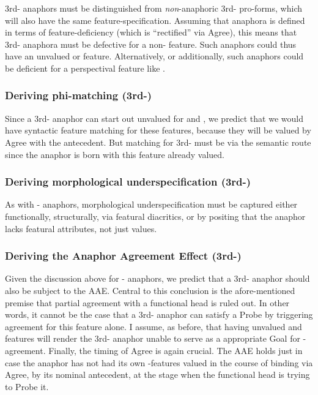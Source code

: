 \documentclass[output=paper, modfonts, nonflat]{langsci/langscibook}
\begin{document}
3rd-\person{} anaphors must be distinguished from \emph{non}-anaphoric
3rd-\person{} pro-forms, which will also have the same
feature-specification. Assuming that anaphora is defined in terms of
feature-deficiency (which is ``rectified'' via Agree), this means that
3rd-\person{} anaphora must be defective for a non-\person{}
feature. Such anaphors could thus have an unvalued \num{} or \gender{}
feature. Alternatively, or additionally, such anaphors could be
deficient for a perspectival feature like \dep{}
\citep{sundaresan:2012, sundaresan:2018}.

\subsubsection{Deriving phi-matching (3rd-\person)}

Since a 3rd-\person{} anaphor can start out unvalued for \num{} and
\gender, we predict that we would have syntactic feature matching for
these features, because they will be valued by Agree with the
antecedent. But matching for 3rd-\person{} must be via the semantic
route since the anaphor is born with this feature already valued.

\subsubsection{Deriving morphological underspecification (3rd-\person)}

As with \nul-\person{} anaphors, morphological underspecification must
be captured either functionally, structurally, via featural
diacritics, or by positing that the anaphor lacks featural attributes,
not just values.

\subsubsection{Deriving the Anaphor Agreement Effect (3rd-\person)}

Given the discussion above for \nul-\person{} anaphors, we predict
that a 3rd-\person{} anaphor should also be subject to the
AAE. Central to this conclusion is the afore-mentioned premise that
partial agreement with a functional head is ruled out. In other words,
it cannot be the case that a 3rd-\person{} anaphor can satisfy a Probe
by triggering agreement for this feature alone. I assume, as before,
that having unvalued \num{} and \gender{} features will render the
3rd-\person{} anaphor unable to serve as a appropriate Goal for
\ph-agreement. Finally, the timing of Agree is again crucial. The AAE
holds just in case the anaphor has not had its own \ph-features valued
in the course of binding via Agree, by its nominal antecedent, at the
stage when the functional head is trying to Probe it.  
\end{document}

